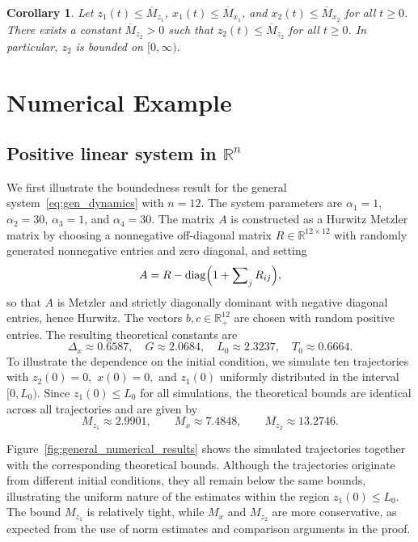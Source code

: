 \documentclass{article}
\DeclareMathOperator{\diag}{diag}
\newtheorem{corollary}{Corollary}
\begin{document}
\begin{corollary}\label{cor:z2_bounded_4d}
    Let $z_1(t)\le \overline{M}_{z_1}$, $x_1(t)\le \overline{M}_{x_1}$, and $x_2(t)\le \overline{M}_{x_2}$ for all 
    $t\ge 0$. There exists a constant $\overline{M}_{z_2}>0$ such that $z_2(t)\le \overline{M}_{z_2}$ 
    for all $t\ge 0$. In particular, $z_2$ is bounded on $[0,\infty)$.
\end{corollary}

\section{Numerical Example} \label{sec:numerics}

\subsection{Positive linear system in $\mathbb{R}^n$}\label{subsec:numerics_general}

We first illustrate the boundedness result for the general
system~\eqref{eq:gen_dynamics} with $n=12$. The system parameters are
$\alpha_1=1$, $\alpha_2=30$, $\alpha_3=1$, and $\alpha_4=30$. The matrix $A$ is constructed as a Hurwitz Metzler matrix by choosing
a nonnegative off-diagonal matrix $R\in\mathbb{R}^{12\times 12}$ with
randomly generated nonnegative entries and zero diagonal, and setting
\begin{equation*}
A = R-\diag\Bigl(1+\sum\nolimits_j R_{ij}\Bigr),
\end{equation*}
so that $A$ is Metzler and strictly diagonally dominant with negative
diagonal entries, hence Hurwitz. The vectors $b,c\in\mathbb{R}^{12}_+$
are chosen with random positive entries. The resulting theoretical constants are
\begin{equation*}
    \Delta_x \approx 0.6587,\quad
    G \approx 2.0684,\quad
    L_0 \approx 2.3237,\quad
    T_0 \approx 0.6664.
\end{equation*}
To illustrate the dependence on the initial condition, we simulate ten trajectories with
$z_2(0)=0,$ $x(0)=0,$ and $z_1(0)$ uniformly distributed in the interval $[0,L_0)$. Since
$z_1(0)\le L_0$ for all simulations, the theoretical bounds are identical across all trajectories and are given by
\begin{equation*}
    M_{z_1} \approx 2.9901,\qquad
    M_x \approx 7.4848,\qquad
    M_{z_2} \approx 13.2746.
\end{equation*}

Figure~\ref{fig:general_numerical_results} shows the simulated trajectories together with the corresponding theoretical bounds. Although the trajectories originate from different initial conditions, they all remain below the same bounds, illustrating the uniform nature of the estimates within the region $z_1(0)\le L_0$. The bound $M_{z_1}$ is relatively tight, while $M_x$ and $M_{z_2}$ are more conservative, as expected from the use of norm estimates and comparison arguments in the proof.
\end{document}
